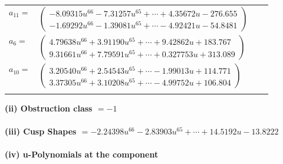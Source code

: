 \documentclass[1p]{elsarticle_modified}
\theoremstyle{definition}
\begin{document}
\begin{tabular}{m{7pt} m{180pt} m{7pt} m{180pt} }
\flushright $a_{11}=$&$\begin{pmatrix}-8.09315 u^{66}-7.31257 u^{65}+\cdots+4.35672 u-276.655\\-1.69292 u^{66}-1.39081 u^{65}+\cdots-4.92421 u-54.8481\end{pmatrix}$ \\
\flushright $a_{6}=$&$\begin{pmatrix}4.79638 u^{66}+3.91190 u^{65}+\cdots+9.42862 u+183.767\\9.31661 u^{66}+7.79591 u^{65}+\cdots+0.327753 u+313.089\end{pmatrix}$ \\
\flushright $a_{10}=$&$\begin{pmatrix}3.20540 u^{66}+2.54543 u^{65}+\cdots-1.99013 u+114.771\\3.37305 u^{66}+3.10208 u^{65}+\cdots-4.99752 u+106.804\end{pmatrix}$\\&\end{tabular}
\flushleft \textbf{(ii) Obstruction class $= -1$}\\~\\
\flushleft \textbf{(iii) Cusp Shapes $= -2.24398 u^{66}-2.83903 u^{65}+\cdots+14.5192 u-13.8222$}\\~\\
\newpage\renewcommand{\arraystretch}{1}
\flushleft \textbf{(iv) u-Polynomials at the component}\newline \\
\end{document}
